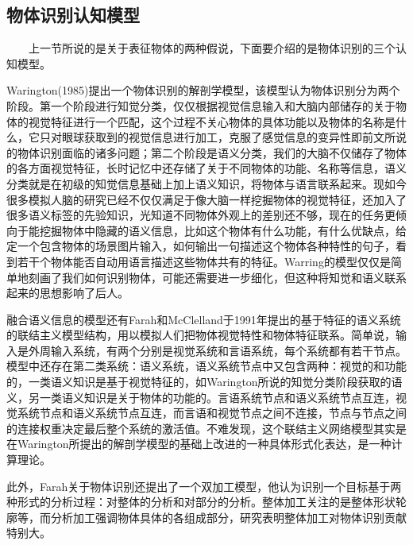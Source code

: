 \documentclass{article}
\begin{document}
\begin{spacing}{1.0}
\subsection{物体识别认知模型}
\ \ \ \ 上一节所说的是关于表征物体的两种假说，下面要介绍的是物体识别的三个认知模型。\par 
Warington(1985)提出一个物体识别的解剖学模型，该模型认为物体识别分为两个阶段。第一个阶段进行知觉分类，仅仅根据视觉信息输入和大脑内部储存的关于物体的视觉特征进行一个匹配，这个过程不关心物体的具体功能以及物体的名称是什么，它只对眼球获取到的视觉信息进行加工，克服了感觉信息的变异性即前文所说的物体识别面临的诸多问题；第二个阶段是语义分类，我们的大脑不仅储存了物体的各方面视觉特征，长时记忆中还存储了关于不同物体的功能、名称等信息，语义分类就是在初级的知觉信息基础上加上语义知识，将物体与语言联系起来。现如今很多模拟人脑的研究已经不仅仅满足于像大脑一样挖掘物体的视觉特征，还加入了很多语义标签的先验知识，光知道不同物体外观上的差别还不够，现在的任务更倾向于能挖掘物体中隐藏的语义信息，比如这个物体有什么功能，有什么优缺点，给定一个包含物体的场景图片输入，如何输出一句描述这个物体各种特性的句子，看到若干个物体能否自动用语言描述这些物体共有的特征。Warring的模型仅仅是简单地刻画了我们如何识别物体，可能还需要进一步细化，但这种将知觉和语义联系起来的思想影响了后人。\par 
	融合语义信息的模型还有Farah和McClelland于1991年提出的基于特征的语义系统的联结主义模型结构，用以模拟人们把物体视觉特性和物体特征联系。简单说，输入是外周输入系统，有两个分别是视觉系统和言语系统，每个系统都有若干节点。模型中还存在第二类系统：语义系统，语义系统节点中又包含两种：视觉的和功能的，一类语义知识是基于视觉特征的，如Warington所说的知觉分类阶段获取的语义，另一类语义知识是关于物体的功能的。言语系统节点和语义系统节点互连，视觉系统节点和语义系统节点互连，而言语和视觉节点之间不连接，节点与节点之间的连接权重决定最后整个系统的激活值。不难发现，这个联结主义网络模型其实是在Warington所提出的解剖学模型的基础上改进的一种具体形式化表达，是一种计算理论。\par 
	此外，Farah关于物体识别还提出了一个双加工模型，他认为识别一个目标基于两种形式的分析过程：对整体的分析和对部分的分析。整体加工关注的是整体形状轮廓等，而分析加工强调物体具体的各组成部分，研究表明整体加工对物体识别贡献特别大。

\end{spacing}
\end{document}
